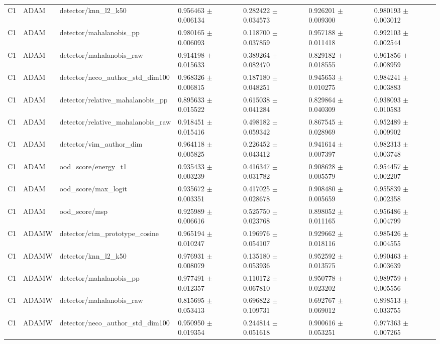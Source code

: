\begin{longtable}{lllllll}
C1 & ADAM & detector/knn\_l2\_k50 & 0.956463 $\pm$ 0.006134 & 0.282422 $\pm$ 0.034573 & 0.926201 $\pm$ 0.009300 & 0.980193 $\pm$ 0.003012 \\
C1 & ADAM & detector/mahalanobis\_pp & 0.980165 $\pm$ 0.006093 & 0.118700 $\pm$ 0.037859 & 0.957188 $\pm$ 0.011418 & 0.992103 $\pm$ 0.002544 \\
C1 & ADAM & detector/mahalanobis\_raw & 0.914198 $\pm$ 0.015633 & 0.389264 $\pm$ 0.082470 & 0.829182 $\pm$ 0.018555 & 0.961856 $\pm$ 0.008959 \\
C1 & ADAM & detector/neco\_author\_std\_dim100 & 0.968326 $\pm$ 0.006815 & 0.187180 $\pm$ 0.048251 & 0.945653 $\pm$ 0.010275 & 0.984241 $\pm$ 0.003883 \\
C1 & ADAM & detector/relative\_mahalanobis\_pp & 0.895633 $\pm$ 0.015522 & 0.615038 $\pm$ 0.041284 & 0.829864 $\pm$ 0.040309 & 0.938093 $\pm$ 0.010583 \\
C1 & ADAM & detector/relative\_mahalanobis\_raw & 0.918451 $\pm$ 0.015416 & 0.498182 $\pm$ 0.059342 & 0.867545 $\pm$ 0.028969 & 0.952489 $\pm$ 0.009902 \\
C1 & ADAM & detector/vim\_author\_dim & 0.964118 $\pm$ 0.005825 & 0.226452 $\pm$ 0.043412 & 0.941614 $\pm$ 0.007397 & 0.982313 $\pm$ 0.003748 \\
C1 & ADAM & ood\_score/energy\_t1 & 0.935433 $\pm$ 0.003239 & 0.416347 $\pm$ 0.031782 & 0.908628 $\pm$ 0.005579 & 0.954457 $\pm$ 0.002207 \\
C1 & ADAM & ood\_score/max\_logit & 0.935672 $\pm$ 0.003351 & 0.417025 $\pm$ 0.028678 & 0.908480 $\pm$ 0.005659 & 0.955839 $\pm$ 0.002358 \\
C1 & ADAM & ood\_score/msp & 0.925989 $\pm$ 0.006616 & 0.525750 $\pm$ 0.023768 & 0.898052 $\pm$ 0.011165 & 0.956486 $\pm$ 0.004799 \\
C1 & ADAMW & detector/ctm\_prototype\_cosine & 0.965194 $\pm$ 0.010247 & 0.196976 $\pm$ 0.054107 & 0.929662 $\pm$ 0.018116 & 0.985426 $\pm$ 0.004555 \\
C1 & ADAMW & detector/knn\_l2\_k50 & 0.976931 $\pm$ 0.008079 & 0.135180 $\pm$ 0.053936 & 0.952592 $\pm$ 0.013575 & 0.990463 $\pm$ 0.003639 \\
C1 & ADAMW & detector/mahalanobis\_pp & 0.977491 $\pm$ 0.012357 & 0.110172 $\pm$ 0.067810 & 0.950778 $\pm$ 0.023202 & 0.989759 $\pm$ 0.005556 \\
C1 & ADAMW & detector/mahalanobis\_raw & 0.815695 $\pm$ 0.053413 & 0.696822 $\pm$ 0.109731 & 0.692767 $\pm$ 0.069012 & 0.898513 $\pm$ 0.033755 \\
C1 & ADAMW & detector/neco\_author\_std\_dim100 & 0.950950 $\pm$ 0.019354 & 0.244814 $\pm$ 0.051618 & 0.900616 $\pm$ 0.053251 & 0.977363 $\pm$ 0.007265 \\

\end{longtable}
